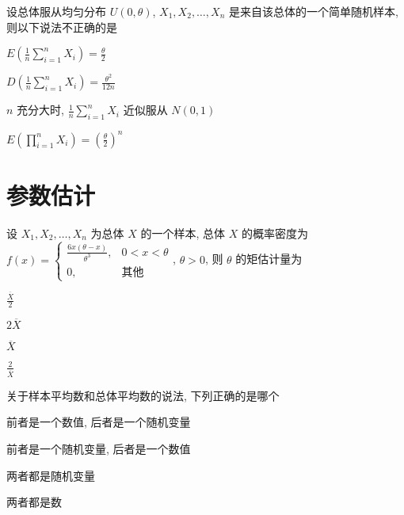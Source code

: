 \documentclass{exam-zh}
\begin{document}
\begin{question}
  设总体服从均匀分布 $U(0, \theta)$, $X_1, X_2, \dots, X_n$ 是来自该总体的一个简单随机样本, 则以下说法不正确的是 \paren[C]
  
  \begin{choices}
    \item $E\left(\frac{1}{n}\sum_{i=1}^{n}X_i\right) = \frac{\theta}{2}$
    \item $D\left(\frac{1}{n}\sum_{i=1}^{n}X_i\right) = \frac{\theta^2}{12n}$
    \item $n$ 充分大时, $\frac{1}{n}\sum_{i=1}^{n}X_i$ 近似服从 $N(0, 1)$
    \item $E\left(\prod_{i=1}^{n}X_i\right) = \left(\frac{\theta}{2}\right)^n$
  \end{choices}
\end{question}

\section{参数估计}

\begin{question}
  设 $X_1, X_2, \dots, X_n$ 为总体 $X$ 的一个样本, 总体 $X$ 的概率密度为 $f(x) = \begin{cases} \frac{6x(\theta - x)}{\theta^3}, & 0 < x < \theta \\ 0, & \text{其他} \end{cases}$, $\theta > 0$, 则 $\theta$ 的矩估计量为 \paren[B]
  
  \begin{choices}
    \item $\frac{\overline{X}}{2}$
    \item $2\overline{X}$
    \item $\overline{X}$
    \item $\frac{2}{\overline{X}}$
  \end{choices}
\end{question}

\begin{question}
  关于样本平均数和总体平均数的说法, 下列正确的是哪个 \paren[B]
  
  \begin{choices}
    \item 前者是一个数值, 后者是一个随机变量
    \item 前者是一个随机变量, 后者是一个数值
    \item 两者都是随机变量
    \item 两者都是数
  \end{choices}
\end{question}
\end{document}
